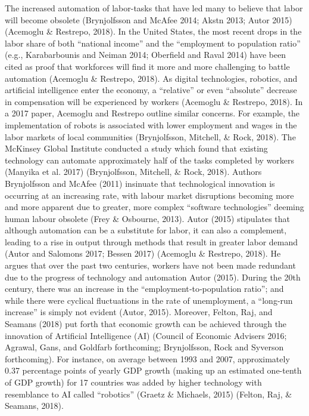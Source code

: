 \documentclass[12pt]{article}
\begin{document}
\begin{flushleft}
\break
\linebreak
The increased automation of labor-tasks that have led many to believe that labor will become obsolete (Brynjolfsson and McAfee 2014; Akstn 2013; Autor 2015) (Acemoglu \& Restrepo, 2018). In the United States, the most recent drops in the labor share of both ``national income” and the ``employment to population ratio” (e.g., Karabarbounis and Neiman 2014; Oberfield and Raval 2014) have been cited as proof that workforces will find it more and more challenging to battle automation (Acemoglu \& Restrepo, 2018). As digital technologies, robotics, and artificial intelligence enter the economy, a ``relative” or even ``absolute” decrease in compensation will be experienced by workers (Acemoglu \& Restrepo, 2018). 
\break
\linebreak
In a 2017 paper, Acemoglu and Restrepo outline similar concerns. For example, the implementation of robots is associated with lower employment and wages in the labor markets of local communities (Brynjolfsson, Mitchell, \& Rock, 2018). The McKinsey Global Institute conducted a study which found that existing technology can automate approximately half of the tasks completed by workers (Manyika et al. 2017) (Brynjolfsson, Mitchell, \& Rock, 2018). Authors Brynjolfsson and McAfee (2011) insinuate that technological innovation is occurring at an increasing rate, with labour market disruptions becoming more and more apparent due to greater, more complex ``software technologies” deeming human labour obsolete (Frey \& Osbourne, 2013).
\break
\linebreak
Autor (2015) stipulates that although automation can be a substitute for labor, it can also a complement, leading to a rise in output through methods that result in greater labor demand (Autor and Salomons 2017; Bessen 2017) (Acemoglu \& Restrepo, 2018). He argues that over the past two centuries, workers have not been made redundant due to the progress of technology and automation Autor (2015). During the 20th century, there was an increase in the ``employment‐to‐population ratio”; and while there were cyclical fluctuations in the rate of unemployment, a ``long-run increase” is simply not evident (Autor, 2015). Moreover, Felton, Raj, and Seamans (2018) put forth that economic growth can be achieved through the innovation of Artificial Intelligence (AI) (Council of Economic Advisers 2016; Agrawal, Gans, and Goldfarb forthcoming; Brynjolfsson, Rock and Syverson forthcoming). For instance, on average between 1993 and 2007, approximately 0.37 percentage points of yearly GDP growth (making up an estimated one-tenth of GDP growth) for 17 countries was added by higher technology with resemblance to AI called “robotics” (Graetz \& Michaels, 2015) (Felton, Raj, \& Seamans, 2018). 

\end{flushleft}
\end{document}
